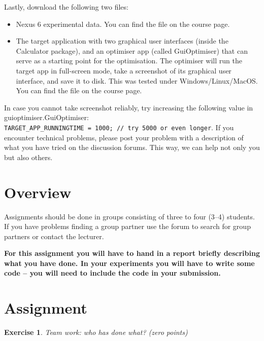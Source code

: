 \documentclass{pracs}
\newtheorem{exercise}{Exercise}
\begin{document}
Lastly, download the following two files:

\begin{itemize}
\item Nexus 6 experimental data. You can find the file on the course page. %
\item The target application with two graphical user interfaces (inside the Calculator package), and  an optimiser app (called GuiOptimiser) that can serve as a starting point for the optimisation. The optimiser will run the target app in full-screen mode, take a screenshot of its graphical user interface, and save it to disk. This was tested under Windows/Linux/MacOS. You can find the file on the course page.
\end{itemize}

In case you cannot take screenshot reliably, try increasing the following value in guioptimiser.GuiOptimiser: \\\texttt{TARGET\_APP\_RUNNINGTIME = 1000; // try 5000 or even longer}.
If you encounter technical problems, please post your problem with a description of what you have tried on the discussion forums. This way, we can help not only you but also others.





\section{Overview}
Assignments should be done in groups consisting of three to four (3--4) students.  If you have problems finding a group partner use the forum to search for group partners or contact the lecturer.

\textbf{For this assignment you will have to hand in a report briefly describing what you have done. In your experiments you will have to write some code -- you will need to include the code in your submission.}

\section{Assignment}

\begin{exercise}
Team work: who has done what? (zero points)
\end{exercise}
\end{document}
